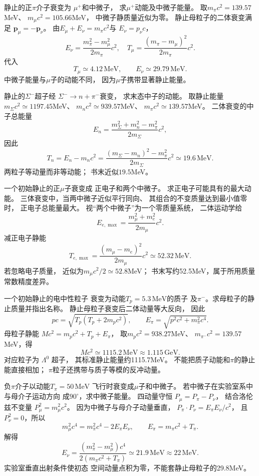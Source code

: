 静止的正$\pi$介子衰变为
$\mu^+$和中微子，
求$\mu^+$动能及中微子能量。
\exsolution
取$m_\pi c^2=139.57$MeV、
$m_\mu c^2=105.66$MeV，
中微子静质量近似为零。
静止母粒子的二体衰变满足
$\boldsymbol p_\mu=-\boldsymbol p_\nu$。
由$E_\mu+E_\nu=m_\pi c^2$与
$E_\nu=p_\nu c$，
\[
 E_\nu=\frac{m_\pi^2-m_\mu^2}{2m_\pi}c^2,
 \quad
 T_\mu=\frac{(m_\pi-m_\mu)^2}{2m_\pi}c^2.
\]
代入
\[
 \boxed{T_\mu\simeq4.12\,\mathrm{MeV}},\qquad
 \boxed{E_\nu\simeq29.79\,\mathrm{MeV}}.
\]
\excheck 中微子能量与$\mu$子的动能不同，
因为$\mu$子携带显著静止能量。

静止的$\Sigma^-$超子经
$\Sigma^-\to n+\pi^-$衰变，
求末态中子的动能。
\exsolution
取静止能量
$m_\Sigma c^2\simeq1197.45$MeV、
$m_nc^2\simeq939.57$MeV、
$m_\pi c^2\simeq139.57$MeV。
二体衰变的中子总能量
\[
 E_n=\frac{m_\Sigma^2+m_n^2-m_\pi^2}
 {2m_\Sigma}c^2,
\]
因此
\[
 \boxed{T_n=E_n-m_nc^2
 =\frac{(m_\Sigma-m_n)^2-m_\pi^2}
 {2m_\Sigma}c^2
 \simeq19.6\,\mathrm{MeV}}.
\]
\excheck 两粒子等动量而非等动能；
书末近似$19.5$MeV。

一个初始静止的正$\mu$子衰变成
正电子和两个中微子。
求正电子可能具有的最大动能。
\exsolution
三体衰变中，当两中微子近似平行同向、
其组合的不变质量达到最小值零时，
正电子总能量最大。
视“两个中微子”为一个零质量系统，
二体运动学给
\[
 E_{e,\max}=
 \frac{m_\mu^2+m_e^2}{2m_\mu}c^2.
\]
减正电子静能
\[
 \boxed{T_{e,\max}=
 \frac{(m_\mu-m_e)^2}{2m_\mu}c^2
 \simeq52.32\,\mathrm{MeV}}.
\]
\excheck 若忽略电子质量，
近似为$m_\mu c^2/2\simeq52.8$MeV；
书末写约52.5MeV，属于所用质量常数精度差异。

一个初始静止的电中性粒子
衰变为动能$T_p=5.3\,\mathrm{MeV}$的质子
及$\pi^-$。求母粒子的静止质量并指出名称。
\exsolution
静止母粒子衰变后二体动量等大反向，
因此
\[
 pc=\sqrt{T_p(T_p+2m_pc^2)},\qquad
 E_\pi=\sqrt{p^2c^2+m_\pi^2c^4}.
\]
母粒子静能
$Mc^2=m_pc^2+T_p+E_\pi$，
取$m_pc^2=938.27$MeV、
$m_{\pi^-}c^2=139.57$MeV，得
\[
 \boxed{Mc^2\simeq1115.2\,\mathrm{MeV}
 \approx1.115\,\mathrm{GeV}}.
\]
对应粒子为
$\boxed{\Lambda^0\text{ 超子}}$，
其标准静止能量约1115.7MeV。
\excheck 不能把质子动能和$\pi$的静止能直接相加；
$\pi$粒子还携带与质子等模的反冲动量。

负$\pi$介子以动能$T_\pi=50\,\mathrm{MeV}$
飞行时衰变成$\mu$子和中微子。
若中微子在实验室系中与母介子运动方向
成$90^\circ$，求中微子能量。
\exsolution
四动量守恒
$P_\mu=P_\pi-P_\nu$，
结合洛伦兹不变量
$P_\mu^2=m_\mu^2c^2$。
因为中微子与母介子动量垂直，
$P_\pi\cdot P_\nu=E_\pi E_\nu/c^2$，
且$P_\nu^2=0$，所以
\[
 m_\mu^2c^4=m_\pi^2c^4-2E_\pi E_\nu,
 \qquad E_\pi=m_\pi c^2+T_\pi.
\]
解得
\[
 \boxed{E_\nu=
 \frac{(m_\pi^2-m_\mu^2)c^4}
 {2(m_\pi c^2+T_\pi)}
 \simeq21.9\,\mathrm{MeV}\approx22\,\mathrm{MeV}}.
\]
\excheck 实验室垂直出射条件使初态
空间动量点积为零，不能套静止母粒子的29.8MeV。

